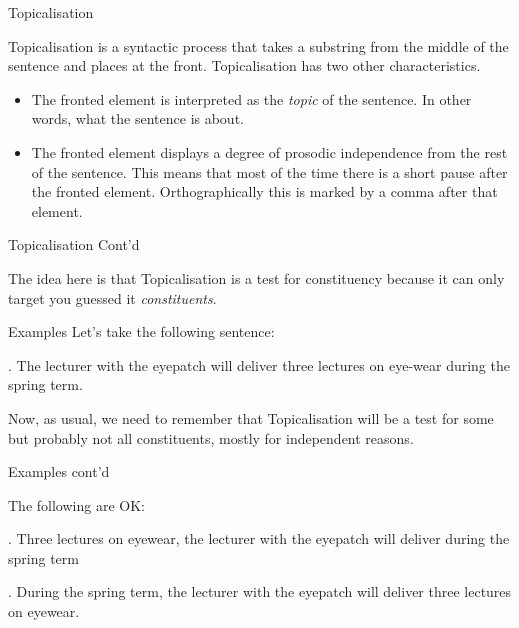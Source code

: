 \begin{frame}
  {Topicalisation}


Topicalisation is a syntactic process that takes a substring from the middle of the sentence and places at the front.  Topicalisation has two other characteristics.

\begin{itemize}
\item The fronted element is interpreted as the \textit{topic} of the sentence.  In other words, what the sentence is about.
\item The fronted element displays a degree of prosodic independence from the rest of the sentence.  This means that most of the time there is a short pause after the fronted element.  Orthographically this is marked by a comma after that element.
\end{itemize}
\end{frame}


\begin{frame}
  {Topicalisation Cont'd}

The idea here is that Topicalisation is a test for constituency because it can only target \pause you guessed it \pause \textit{constituents}.
\end{frame}

\begin{frame}
  {Examples}
Let's take the following sentence:

\ex.
The lecturer with the eyepatch will deliver three lectures on eye-wear during the spring term.

Now, as usual, we need to remember that Topicalisation will be a test for some but probably not all constituents, mostly for independent reasons. 
\end{frame}



\begin{frame}
  {Examples cont'd}

The following are OK:

\ex.
Three lectures on eyewear, the lecturer with the eyepatch will deliver during the spring term

\pause

\ex.
During the spring term, the lecturer with the eyepatch will deliver three lectures on eyewear.

\end{frame}

